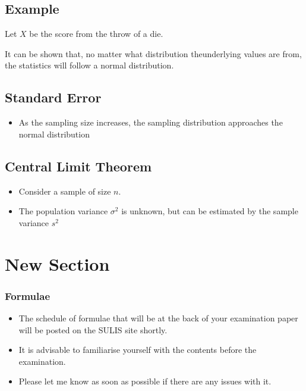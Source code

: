 {{{\subsection{Example}
Let $X$ be the score from the throw of a die.

It can be shown that, no matter what distribution theunderlying values are from, the statistics will follow a normal distribution.


\subsection{Standard Error}

\begin{itemize}

\item As the sampling size increases, the sampling distribution approaches the normal distribution


\end{itemize}

\subsection{Central Limit Theorem}

\begin{itemize}

\item Consider a sample of size $n$.

\item The population variance $\sigma^2$ is unknown, but can be estimated by the sample variance $s^2$


\end{itemize}


}



\section{New Section}

\subsubsection{Formulae}
\begin{itemize}
\item The schedule of formulae that will be at the back of your examination paper will be posted on the SULIS site shortly.
\item It is advisable to familiarise yourself with the contents before the examination.
\item Please let me know as soon as possible if there are any issues with it.
\end{itemize}

}}
